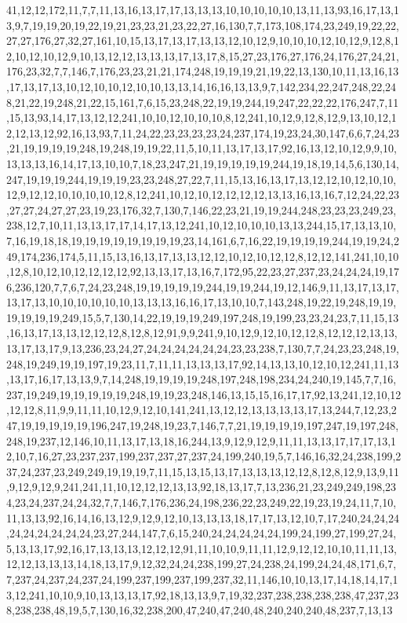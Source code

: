 41,12,12,172,11,7,7,11,13,16,13,17,17,13,13,13,10,10,10,10,10,13,11,13,93,16,17,13,13,9,7,19,19,20,19,22,19,21,23,23,21,23,22,27,16,130,7,7,173,108,174,23,249,19,22,22,27,27,176,27,32,27,161,10,15,13,17,13,17,13,13,12,10,12,9,10,10,10,12,10,12,9,12,8,12,10,12,10,12,9,10,13,12,12,13,13,13,17,13,17,8,15,27,23,176,27,176,24,176,27,24,21,176,23,32,7,7,146,7,176,23,23,21,21,174,248,19,19,19,21,19,22,13,130,10,11,13,16,13,17,13,17,13,10,12,10,10,12,10,10,13,13,14,16,16,13,13,9,7,142,234,22,247,248,22,248,21,22,19,248,21,22,15,161,7,6,15,23,248,22,19,19,244,19,247,22,22,22,176,247,7,11,15,13,93,14,17,13,12,12,241,10,10,12,10,10,10,8,12,241,10,12,9,12,8,12,9,13,10,12,12,12,13,12,92,16,13,93,7,11,24,22,23,23,23,23,24,237,174,19,23,24,30,147,6,6,7,24,23,21,19,19,19,19,248,19,248,19,19,22,11,5,10,11,13,17,13,17,92,16,13,12,10,12,9,9,10,13,13,13,16,14,17,13,10,10,7,18,23,247,21,19,19,19,19,19,244,19,18,19,14,5,6,130,14,247,19,19,19,244,19,19,19,23,23,248,27,22,7,11,15,13,16,13,17,13,12,12,10,12,10,10,12,9,12,12,10,10,10,10,12,8,12,241,10,12,10,12,12,12,12,13,13,16,13,16,7,12,24,22,23,27,27,24,27,27,23,19,23,176,32,7,130,7,146,22,23,21,19,19,244,248,23,23,23,249,23,238,12,7,10,11,13,13,17,17,14,17,13,12,241,10,12,10,10,10,13,13,244,15,17,13,13,10,7,16,19,18,18,19,19,19,19,19,19,19,19,23,14,161,6,7,16,22,19,19,19,19,244,19,19,24,249,174,236,174,5,11,15,13,16,13,17,13,13,12,12,10,12,10,12,12,8,12,12,141,241,10,10,12,8,10,12,10,12,12,12,12,92,13,13,17,13,16,7,172,95,22,23,27,237,23,24,24,24,19,176,236,120,7,7,6,7,24,23,248,19,19,19,19,19,244,19,19,244,19,12,146,9,11,13,17,13,17,13,17,13,10,10,10,10,10,10,13,13,13,16,16,17,13,10,10,7,143,248,19,22,19,248,19,19,19,19,19,19,249,15,5,7,130,14,22,19,19,19,249,197,248,19,199,23,23,24,23,7,11,15,13,16,13,17,13,13,12,12,12,8,12,8,12,91,9,9,241,9,10,12,9,12,10,12,12,8,12,12,12,13,13,13,17,13,17,9,13,236,23,24,27,24,24,24,24,24,24,23,23,238,7,130,7,7,24,23,23,248,19,248,19,249,19,19,197,19,23,11,7,11,11,13,13,13,17,92,14,13,13,10,12,10,12,241,11,13,13,17,16,17,13,13,9,7,14,248,19,19,19,19,248,197,248,198,234,24,240,19,145,7,7,16,237,19,249,19,19,19,19,19,248,19,19,23,248,146,13,15,15,16,17,17,92,13,241,12,10,12,12,12,8,11,9,9,11,11,10,12,9,12,10,141,241,13,12,12,13,13,13,13,17,13,244,7,12,23,247,19,19,19,19,19,196,247,19,248,19,23,7,146,7,7,21,19,19,19,19,197,247,19,197,248,248,19,237,12,146,10,11,13,17,13,18,16,244,13,9,12,9,12,9,11,11,13,13,17,17,17,13,12,10,7,16,27,23,237,237,199,237,237,27,237,24,199,240,19,5,7,146,16,32,24,238,199,237,24,237,23,249,249,19,19,19,7,11,15,13,15,13,17,13,13,13,12,12,8,12,8,12,9,13,9,11,9,12,9,12,9,241,241,11,10,12,12,12,13,13,92,18,13,17,7,13,236,21,23,249,249,198,234,23,24,237,24,24,32,7,7,146,7,176,236,24,198,236,22,23,249,22,19,23,19,24,11,7,10,11,13,13,92,16,14,16,13,12,9,12,9,12,10,13,13,13,18,17,17,13,12,10,7,17,240,24,24,24,24,24,24,24,24,24,23,27,244,147,7,6,15,240,24,24,24,24,24,199,24,199,27,199,27,24,5,13,13,17,92,16,17,13,13,13,12,12,12,91,11,10,10,9,11,11,12,9,12,12,10,10,11,11,13,12,12,13,13,13,14,18,13,17,9,12,32,24,24,238,199,27,24,238,24,199,24,24,48,171,6,7,7,237,24,237,24,237,24,199,237,199,237,199,237,32,11,146,10,10,13,17,14,18,14,17,13,12,241,10,10,9,10,13,13,13,17,92,18,13,13,9,7,19,32,237,238,238,238,238,47,237,238,238,238,48,19,5,7,130,16,32,238,200,47,240,47,240,48,240,240,240,48,237,7,13,13